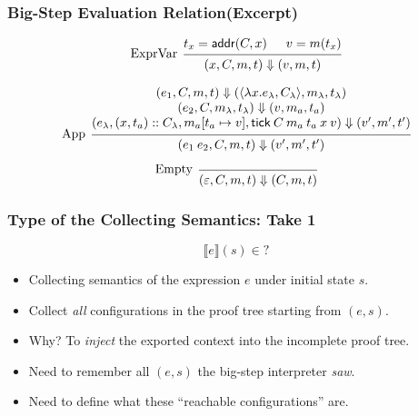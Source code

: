 \documentclass{beamer}
\newcommand*{\cons}{::}
\newcommand*{\mem}{m}
\newcommand*{\sembracket}[1]{\lBrack{#1}\rBrack}
\newcommand*{\addr}{\mathsf{addr}}
\newcommand*{\tick}{\mathsf{tick}}
\begin{document}
\begin{frame}[c]
  \frametitle{Big-Step Evaluation Relation(Excerpt)}
  \begin{figure}[h!]
    \begin{flushright}\fbox{$(e,C,\mem,t)\Downarrow(V,\mem',t')$}\end{flushright}
    \vspace{0pt} %
    \footnotesize
    \[
      \begin{prooftree}
        \hypo{t_{x}=\addr(C,x)}
        \hypo{v=\mem(t_{x})}
        \infer[left label=ExprVar]2{
        (x, C, \mem, t)
        \Downarrow
        (v, \mem, t)
        }
      \end{prooftree}
    \]

    \[
      \begin{prooftree}
        \hypo{
          \begin{matrix}
            (e_{1}, C, \mem, t)
            \Downarrow
            (\langle\lambda x.e_{\lambda}, C_{\lambda}\rangle, \mem_{\lambda}, t_{\lambda}) \\
            (e_{2}, C, \mem_{\lambda}, t_{\lambda})
            \Downarrow
            (v, \mem_{a}, t_{a})                                                            \\
            (e_{\lambda}, (x, t_{a})\cons C_{\lambda}, \mem_{a}[t_{a}\mapsto v], \tick\:C\:\mem_{a}\:t_{a}\:x\:v)
            \Downarrow
            (v', \mem',t')
          \end{matrix}
        }
        \infer[left label={App}]1{
        (e_{1}\:e_{2}, C, \mem, t)
        \Downarrow
        (v', \mem',t')
        }
      \end{prooftree}
    \]

    \[
      \begin{prooftree}
        \infer[left label=Empty]0{
        (\varepsilon, C, \mem, t)
        \Downarrow
        (C, \mem, t)
        }
      \end{prooftree}
    \]
  \end{figure}
\end{frame}

\begin{frame}[c]
  \frametitle{Type of the Collecting Semantics: Take 1}
  \[\sembracket{e}(s)\in ?\]
  \begin{itemize}
    \item Collecting semantics of the expression $e$ under initial state $s$.
    \item Collect \emph{all} configurations in the proof tree starting from $(e,s)$.
    \item Why? To \emph{inject} the exported context into the incomplete proof tree.
    \item Need to remember all $(e,s)$ the big-step interpreter \emph{saw}.
    \item Need to define what these ``reachable configurations'' are.
  \end{itemize}
\end{frame}
\end{document}
